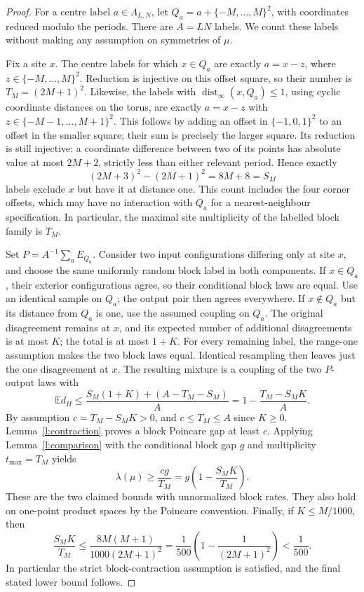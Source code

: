 \begin{proof}
For a centre label \(a\in\Lambda_{L,N}\), let
\(Q_a=a+\{-M,\ldots,M\}^2\), with coordinates reduced modulo
the periods.  There are \(A=LN\) labels.  We count these labels
without making any assumption on symmetries of \(\mu\).

Fix a site \(x\).  The centre labels for which \(x\in Q_a\) are
exactly \(a=x-z\), where \(z\in\{-M,\ldots,M\}^2\).
Reduction is injective on this offset square, so their number is
\(T_M=(2M+1)^2\).  Likewise, the labels with
\(\operatorname{dist}_\infty(x,Q_a)\le1\), using cyclic coordinate
distances on the torus, are exactly \(a=x-z\) with
\(z\in\{-M-1,\ldots,M+1\}^2\).  This follows by adding an
offset in \(\{-1,0,1\}^2\) to an offset in the smaller square;
their sum is precisely the larger square.  Its reduction is still
injective: a coordinate difference between two of its points has
absolute value at most \(2M+2\), strictly less than either relevant
period.  Hence exactly
\[
 (2M+3)^2-(2M+1)^2=8M+8=S_M
\]
labels exclude \(x\) but have it at distance one.  This count
includes the four corner offsets, which may have no interaction with
\(Q_a\) for a nearest-neighbour specification.  In particular, the
maximal site multiplicity of the labelled block family is \(T_M\).

Set \(P=A^{-1}\sum_aE_{Q_a}\).  Consider two input configurations
differing only at site \(x\), and choose the same uniformly random
block label in both components.  If \(x\in Q_a\), their exterior
configurations agree, so their conditional block laws are equal.
Use an identical sample on \(Q_a\); the output pair then agrees
everywhere.  If \(x\notin Q_a\) but its distance from \(Q_a\)
is one, use the assumed coupling on \(Q_a\).  The original
disagreement remains at \(x\), and its expected number of additional
disagreements is at most \(K\); the total is at most \(1+K\).
For every remaining label, the range-one assumption makes the two
block laws equal.  Identical resampling then leaves just the one
disagreement at \(x\).  The resulting mixture is a coupling of
the two \(P\)-output laws with
\[
 \mathbb E d_H
    \le\frac{S_M(1+K)+(A-T_M-S_M)}A
    =1-\frac{T_M-S_MK}A.
\]
By assumption \(c=T_M-S_MK>0\), and
\(c\le T_M\le A\) since \(K\ge0\).
Lemma~\ref{l:contraction} proves a block Poincare gap at least \(c\).
Applying Lemma~\ref{l:comparison} with the conditional block gap
\(g\) and multiplicity \(t_{\max}=T_M\) yields
\[
 \lambda(\mu)\ge\frac{cg}{T_M}
             =g\left(1-\frac{S_MK}{T_M}\right).
\]
These are the two claimed bounds with unnormalized block rates.
They also hold on one-point product spaces by the Poincare convention.
Finally, if \(K\le M/1000\), then
\[
 \frac{S_MK}{T_M}
 \le\frac{8M(M+1)}{1000(2M+1)^2}
 =\frac1{500}\left(1-\frac1{(2M+1)^2}\right)
 <\frac1{500}.
\]
In particular the strict block-contraction assumption is satisfied,
and the final stated lower bound follows.
\end{proof}




